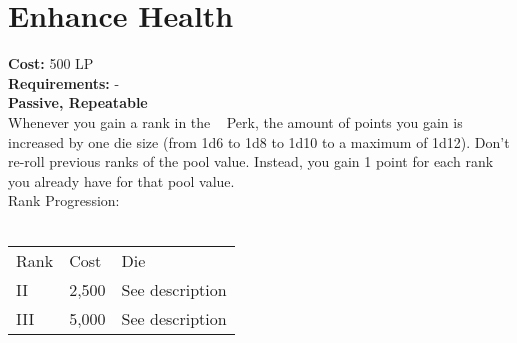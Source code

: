 \section{Enhance Health}\label{sec:enhanceHealth}
\textbf{Cost:} 500 LP\\
\textbf{Requirements:} -\\
\textbf{Passive, Repeatable}\\
Whenever you gain a rank in the ~ Perk, the amount of points you gain is increased by one die size (from 1d6 to 1d8 to 1d10 to a maximum of 1d12).
Don't re-roll previous ranks of the pool value.
Instead, you gain 1 point for each rank you already have for that pool value.
\\
Rank Progression:\\
\\
\begin{tabular}{l | l | p{12cm} }
    Rank & Cost & Die\\
    II & 2,500 & See description \\
    III & 5,000 & See description \\
\end{tabular}